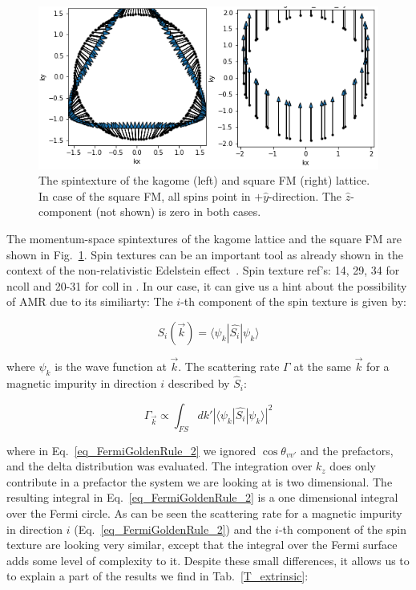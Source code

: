 \documentclass[prb,showpacs,amsmath,amssymb,superscriptaddress,twocolumn,floatfix]{revtex4-1}
\begin{document}
\begin{figure}
	\centering
	\includegraphics[width=1\linewidth]{img/Combined_Spintexture}
	\caption{The spintexture of the kagome (left) and square FM (right) lattice. In case of the square FM, all spins point in $+\hat{y}$-direction. The $\hat{z}$-component (not shown) is zero in both cases.}
	\label{fig:combinedspintexture}
\end{figure}

The momentum-space spintextures of the kagome lattice and the square FM are shown in Fig.~\ref{fig:combinedspintexture}. Spin textures can be an important tool as already shown in the context of the non-relativistic Edelstein effect~\cite{Gonzalez-Hernandez:2024}. {\color{red} Spin texture ref's: 14, 29, 34 for ncoll and 20-31 for coll in \cite{Gonzalez-Hernandez:2024}}. In our case, it can give us a hint about the possibility of AMR due to its similiarty: The $i$-th component of the spin texture is given by:

\begin{equation}
	S_i (\vec{k}) = \langle \psi_k | \hat{S_i} | \psi_k \rangle
\label{eq_spintexture}
\end{equation}

where $\psi_k$ is the wave function at $\vec{k}$. The scattering rate $\Gamma$ at the same $\vec{k}$ for a magnetic impurity in direction $i$ described by $\hat{S}_i$:

\begin{equation}	
{\Gamma_{\vec{k}}} \propto \int_{FS} dk' |\langle \psi_k |\hat{S_i}|\psi_k \rangle|^2
\label{eq_FermiGoldenRule_2}
\end{equation}

where in Eq.~\ref{eq_FermiGoldenRule_2} we ignored $\cos \theta_{vv'}$ and the prefactors, and the delta distribution was evaluated. The integration over $k_z$ does only contribute in a prefactor the system we are looking at is two dimensional. The resulting integral in Eq.~\ref{eq_FermiGoldenRule_2} is a one dimensional integral over the Fermi circle. As can be seen the scattering rate for a magnetic impurity in direction $i$ (Eq.~\ref{eq_FermiGoldenRule_2}) and the $i$-th component of the spin texture are looking very similar, except that the integral over the Fermi surface adds some level of complexity to it. Despite these small differences, it allows us to to explain a part of the results we find in Tab.~\ref{T_extrinsic}:
\end{document}
